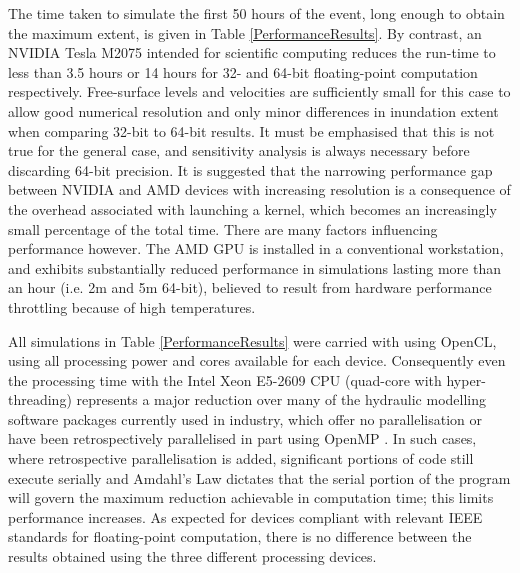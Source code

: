 The time taken to simulate the first 50 hours of the event, long enough to obtain the maximum extent, is given in Table \ref{PerformanceResults}. By contrast, an NVIDIA Tesla M2075 intended for scientific computing reduces the run-time to less than 3.5 hours or 14 hours for 32- and 64-bit floating-point computation respectively. Free-surface levels and velocities are sufficiently small for this case to allow good numerical resolution and only minor differences in inundation extent when comparing 32-bit to 64-bit results. It must be emphasised that this is not true for the general case, and sensitivity analysis is always necessary before discarding 64-bit precision. It is suggested that the narrowing performance gap between NVIDIA and AMD devices with increasing resolution is a consequence of the overhead associated with launching a kernel, which becomes an increasingly small percentage of the total time. There are many factors influencing performance however. The AMD GPU is installed in a conventional workstation, and exhibits substantially reduced performance in simulations lasting more than an hour (i.e. 2m and 5m 64-bit), believed to result from hardware performance throttling because of high temperatures.

All simulations in Table \ref{PerformanceResults} were carried with using OpenCL, using all processing power and cores available for each device. Consequently even the processing time with the Intel Xeon E5-2609 CPU (quad-core with hyper-threading) represents a major reduction over many of the hydraulic modelling software packages currently used in industry, which offer no parallelisation or have been retrospectively parallelised in part using OpenMP \citep{Pender2010,Pender2013}. In such cases, where retrospective parallelisation is added, significant portions of code still execute serially and Amdahl's Law dictates that the serial portion of the program will govern the maximum reduction achievable in computation time; this limits performance increases. As expected for devices compliant with relevant IEEE standards for floating-point computation, there is no difference between the results obtained using the three different processing devices. 

